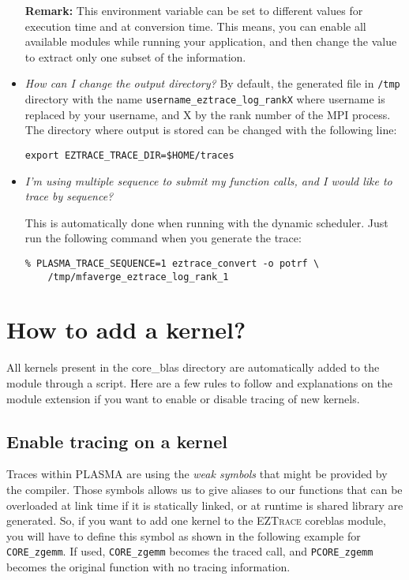 \begin{itemize}
\textbf{Remark:} This environment variable can be set to different
values for execution time and at conversion time. This means, you can
enable all available modules while running your application, and then
change the value to extract only one subset of the information.

\item \textit{How can I change the output directory?}\newline
  By default, the generated file in \texttt{/tmp} directory with the
  name \texttt{username\_eztrace\_log\_rankX} where username is
  replaced by your username, and X by the rank number of the MPI process.
  The directory where output is stored can be changed with the
  following line:
\begin{verbatim}
export EZTRACE_TRACE_DIR=$HOME/traces
\end{verbatim}

\item \textit{I'm using multiple sequence to submit my function calls,
  and I would like to trace by sequence?}\newline

  This is automatically done when running with the dynamic
  scheduler. Just run the following command when you generate the trace:
\begin{verbatim}
% PLASMA_TRACE_SEQUENCE=1 eztrace_convert -o potrf \
    /tmp/mfaverge_eztrace_log_rank_1
\end{verbatim}
\end{itemize}

\section{How to add a kernel?}

All kernels present in the core\_blas directory are automatically
added to the module through a script. Here are a few rules to follow
and explanations on the module extension if you want to enable or
disable tracing of new kernels.

\subsection{Enable tracing on a kernel}

Traces within PLASMA are using the \emph{weak symbols} that might be
provided by the compiler. Those symbols allows us to give aliases to
our functions that can be overloaded at link time if it is statically
linked, or at runtime is shared library are generated. So, if you want
to add one kernel to the \textsc{EZTrace} coreblas module, you will
have to define this symbol as shown in the following example for
\texttt{CORE\_zgemm}. If used, \texttt{CORE\_zgemm} becomes the traced
call, and \texttt{PCORE\_zgemm} becomes the original function with no
tracing information.


